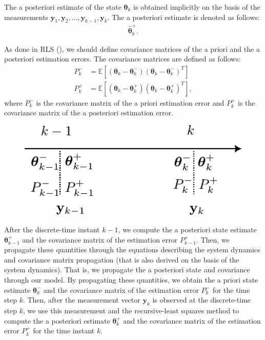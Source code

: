 The a posteriori estimate of the state $\boldsymbol{\theta}_{k}$ is obtained implicitly on the basis of the measurements $\mathbf{y}_{1},\mathbf{y}_{2},\ldots, \mathbf{y}_{k-1},\mathbf{y}_{k}$. The a posteriori estimate is denoted as follows:
\begin{align*}
	\hat{\boldsymbol{\theta}}_{k}^{+}.
\end{align*}

As done in RLS (\cf {}), we should define covariance matrices of the a priori and the a posteriori estimation errors. The covariance matrices are defined as follows:
\begin{align*}
	P_{k}^{-}&=\mathbb{E}[(\boldsymbol{\theta}_{k}-\boldsymbol{\theta}_{k}^{-})(\boldsymbol{\theta}_{k}-\boldsymbol{\theta}_{k}^{-})^{T}] \\
	P_{k}^{+}&=\mathbb{E}[(\boldsymbol{\theta}_{k}-\boldsymbol{\theta}_{k}^{+})(\boldsymbol{\theta}_{k}-\boldsymbol{\theta}_{k}^{+})^{T}],
\end{align*}
where $P_{k}^{-}$ is the covariance matrix of the a priori estimation error and $P_{k}^{+}$ is the covariance matrix of the a posteriori estimation error. 
\begin{figure}[h]
	\centering
	\includegraphics[scale=0.6]{./images/state_space/kalman_filter_1.pdf}
\end{figure}

After the discrete-time instant $k-1$, we compute the a posteriori state estimate $\boldsymbol{\theta}_{k-1}^{+}$ and the covariance matrix of the estimation error $P_{k-1}^{+}$. Then, we propagate these quantities through the equations describing the system dynamics and covariance matrix propagation (that is also derived on the basis of the system dynamics). That is, we propagate the a posteriori state and covariance through our model. By propagating these quantities, we obtain the a priori state estimate $\boldsymbol{\theta}_{k}^{-}$ and the covariance matrix of the estimation error $P_{k}^{-}$ for the time step $k$. Then, after the measurement vector $\mathbf{y}_{k}$ is observed at the discrete-time step $k$, we use this measurement and the recursive-least squares method to compute the a posteriori estimate $\boldsymbol{\theta}_{k}^{+}$ and the covariance matrix of the estimation error $P_{k}^{+}$ for the time instant $k$.

